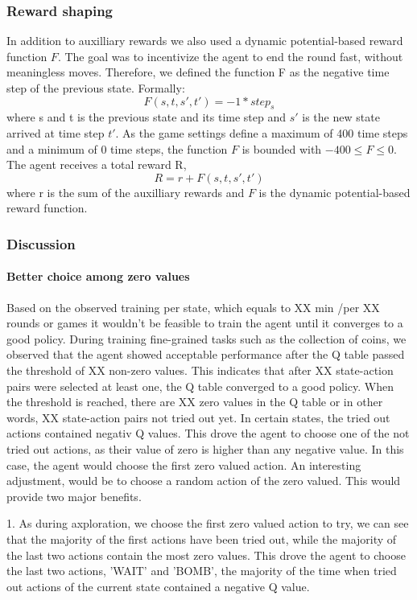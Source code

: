 \documentclass[
	letterpaper, %
	12pt, %
]{CSUniSchoolLabReport}
\begin{document}
\subsubsection{Reward shaping \AB}
In addition to auxilliary rewards we also used a dynamic potential-based reward function $F$.
The goal was to incentivize the agent to end the round fast, without meaningless
moves. Therefore, we defined the function F as the negative time step of the previous state.
Formally:
\[F(s,t,s',t') = -1 * step_s\]
where s and t is the previous state and its time step and $s'$ is the new state arrived at
time step $t'$. As the game settings define a maximum of 400 time steps and a minimum
of 0 time steps, the function $F$ is bounded with $-400 \leq F \leq 0$.
The agent receives a total reward R,
\[R = r + F(s,t,s',t')\]
where r is the sum of the auxilliary rewards and $F$ is the dynamic
potential-based reward function.



\subsubsection{Discussion}

\paragraph*{Better choice among zero values}
Based on the observed training per state, which equals to XX min /per XX rounds or games it wouldn't
be feasible to train the agent until it converges to a good policy. During training fine-grained
tasks such as the collection of coins, we observed that the agent showed acceptable performance
after the Q table passed the threshold of XX non-zero values. This indicates that after XX state-action pairs
were selected at least one, the Q table converged to a good policy.
When the threshold is reached, there are XX zero values in the Q table or in other words, XX state-action pairs not
tried out yet. In certain states, the tried out actions contained negativ Q values. This drove the agent to
choose one of the not tried out actions, as their value of zero is higher than any negative value.
In this case, the agent would choose the first zero valued action. An interesting adjustment, would
be to choose a random action of the zero valued. This would provide two major benefits.

1. As during axploration, we choose the first zero valued action to try, we can see that the
majority of the first actions have been tried out, while the majority of the last two actions contain the most zero values.
This drove the agent to choose the last two actions, 'WAIT' and 'BOMB', the majority of the time
when tried out actions of the current state contained a negative Q value.
\end{document}
